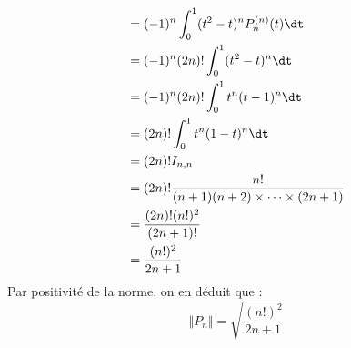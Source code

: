 \documentclass[a4paper,10pt]{report}
\begin{document}
\begin{enumerate}
\begin{align*}
& = (-1)^n \int_{0}^1 (t^2-t)^n P_n^{(n)}(t) \dt \\
& = (-1)^n (2n)! \int_{0}^1 (t^2-t)^n  \dt \\
& = (-1)^n (2n)! \int_{0}^1t^n(t-1)^n  \dt \\
& = (2n)! \int_{0}^1t^n(1-t)^n  \dt \\
& = (2n)! I_{n,n} \\
& =(2n)! \dfrac{n!}{(n+1)(n+2) \times \cdots \times (2n+1)} \\
& = \dfrac{(2n)!(n!)^2}{(2n+1)!} \\
& = \dfrac{(n!)^2}{2n+1}
\end{align*}
Par positivité de la norme, on en déduit que :
$$ \Vert P_n \Vert = \sqrt{\dfrac{(n!)^2}{2n+1}}$$
\end{enumerate}







 
 
\end{document}
